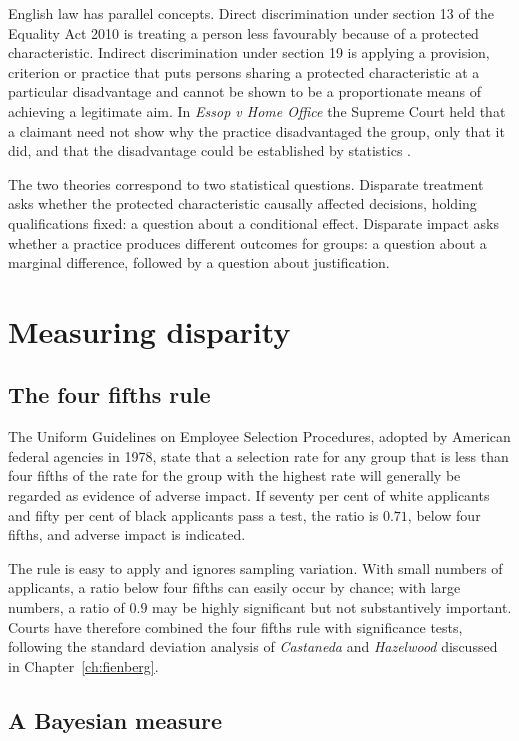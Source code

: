 English law has parallel concepts. Direct discrimination under section 13 of the Equality Act 2010 is treating a person less favourably because of a protected characteristic. Indirect discrimination under section 19 is applying a provision, criterion or practice that puts persons sharing a protected characteristic at a particular disadvantage and cannot be shown to be a proportionate means of achieving a legitimate aim. In \emph{Essop v Home Office} the Supreme Court held that a claimant need not show why the practice disadvantaged the group, only that it did, and that the disadvantage could be established by statistics \citep{essop2017}.

The two theories correspond to two statistical questions. Disparate treatment asks whether the protected characteristic causally affected decisions, holding qualifications fixed: a question about a conditional effect. Disparate impact asks whether a practice produces different outcomes for groups: a question about a marginal difference, followed by a question about justification.

\section{Measuring disparity}

\subsection{The four fifths rule}

The Uniform Guidelines on Employee Selection Procedures, adopted by American federal agencies in 1978, state that a selection rate for any group that is less than four fifths of the rate for the group with the highest rate will generally be regarded as evidence of adverse impact. If seventy per cent of white applicants and fifty per cent of black applicants pass a test, the ratio is $0.71$, below four fifths, and adverse impact is indicated.

The rule is easy to apply and ignores sampling variation. With small numbers of applicants, a ratio below four fifths can easily occur by chance; with large numbers, a ratio of $0.9$ may be highly significant but not substantively important. Courts have therefore combined the four fifths rule with significance tests, following the standard deviation analysis of \emph{Castaneda} and \emph{Hazelwood} discussed in Chapter~\ref{ch:fienberg}.

\subsection{A Bayesian measure}

